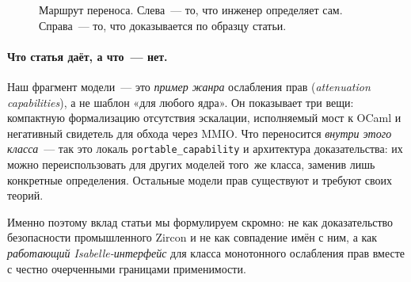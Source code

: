 \documentclass[11pt,a4paper]{article}
\begin{document}
\begin{figure}[htbp]
	\centering
	\caption{Маршрут переноса. Слева~--- то, что инженер определяет сам.
		Справа~--- то, что доказывается по образцу статьи.}
	\label{fig:port-route}
\end{figure}

\paragraph{Что статья даёт, а что~--- нет.}
Наш фрагмент модели~--- это \emph{пример жанра} ослабления прав
(\emph{attenuation capabilities}), а не шаблон «для любого ядра». Он
показывает три вещи: компактную формализацию отсутствия эскалации,
исполняемый мост к OCaml и негативный свидетель для обхода через
MMIO. Что переносится \emph{внутри этого класса}~--- так это локаль
\texttt{portable\_capability} и архитектура доказательства: их можно
переиспользовать для других моделей того~же класса, заменив лишь
конкретные определения. Остальные модели прав существуют и требуют
своих теорий.

Именно поэтому вклад статьи мы формулируем скромно: не как
доказательство безопасности промышленного Zircon и не как совпадение
имён с ним, а как \emph{работающий Isabelle-интерфейс} для класса
монотонного ослабления прав вместе с честно очерченными границами
применимости.
\end{document}
